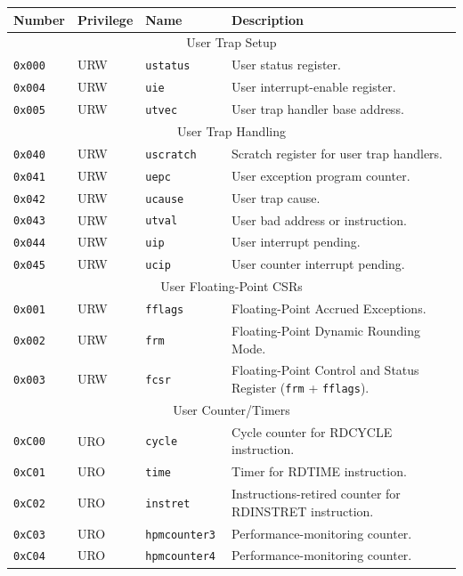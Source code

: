 \begin{table}[htb!]
\begin{center}
\begin{tabular}{|l|l|l|l|}
\hline
Number    & Privilege & Name & Description \\
\hline
\multicolumn{4}{|c|}{User Trap Setup} \\
\hline
\tt 0x000 & URW  &\tt ustatus    & User status register. \\
\tt 0x004 & URW  &\tt uie        & User interrupt-enable register. \\
\tt 0x005 & URW  &\tt utvec      & User trap handler base address. \\
\hline
\multicolumn{4}{|c|}{User Trap Handling} \\
\hline
\tt 0x040 & URW  &\tt uscratch   & Scratch register for user trap handlers. \\
\tt 0x041 & URW  &\tt uepc       & User exception program counter. \\
\tt 0x042 & URW  &\tt ucause     & User trap cause. \\
\tt 0x043 & URW  &\tt utval      & User bad address or instruction. \\
\tt 0x044 & URW  &\tt uip        & User interrupt pending. \\
\tt 0x045 & URW  &\tt ucip       & User counter interrupt pending. \\
\hline
\multicolumn{4}{|c|}{User Floating-Point CSRs} \\
\hline
\tt 0x001 & URW  &\tt fflags     & Floating-Point Accrued Exceptions. \\
\tt 0x002 & URW  &\tt frm        & Floating-Point Dynamic Rounding Mode. \\
\tt 0x003 & URW  &\tt fcsr       & Floating-Point Control and Status
Register ({\tt frm} + {\tt fflags}). \\
\hline
\multicolumn{4}{|c|}{User Counter/Timers} \\
\hline
\tt 0xC00 & URO  &\tt cycle         & Cycle counter for RDCYCLE instruction. \\
\tt 0xC01 & URO  &\tt time          & Timer for RDTIME instruction. \\
\tt 0xC02 & URO  &\tt instret       & Instructions-retired counter for RDINSTRET instruction. \\
\tt 0xC03 & URO  &\tt hpmcounter3   & Performance-monitoring counter. \\
\tt 0xC04 & URO  &\tt hpmcounter4   & Performance-monitoring counter. \\

\end{tabular}
\end{center}
\end{table}
